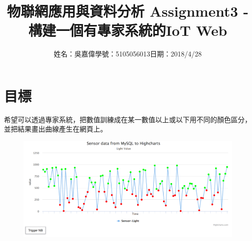 \documentclass[12pt,a4paper]{article}
\title{\huge 物聯網應用與資料分析 Assignment3 - 構建一個有專家系統的IoT Web} %
\author{姓名：吳嘉偉\quad 學號：5105056013\quad 日期：2018/4/28} %
\date{} %
\begin{document}
\clearpage

\maketitle %

\section{目標}
{
\fontsize{14pt}{10pt} %
\selectfont %
希望可以透過專家系統，把數值訓練成在某一數值以上或以下用不同的顏色區分，並把結果畫出曲線產生在網頁上。
\begin{figure}[ht]
\centering
\includegraphics[width=1.0\textwidth]{image/resultcharts.png}
\end{figure}
}

\newpage %
\end{document}
